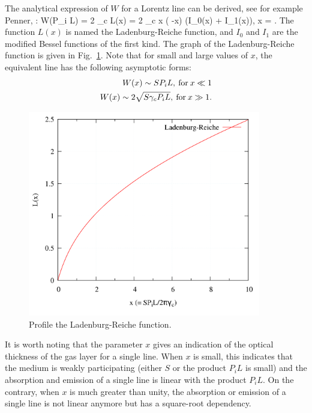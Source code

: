 The analytical expression of $W$ for a Lorentz line can be derived, see for example Penner, \cite{Penner1959}:
\be
W(P_i L) = 2 \pi \gamma_c L(x) = 2  \pi \gamma_c x \;\exp\left( -x\right) \left(I_0(x) + I_1(x)\right), \; x = .
\ee
The function $L(x)$ is named the Ladenburg-Reiche function, and $I_0$ and $I_1$ are the modified Bessel functions of the first kind. The graph of the Ladenburg-Reiche function is
given in Fig.~\ref{fig:Ladenburg}. Note that for small and large values of $x$, the equivalent line has the following asymptotic forms:
\begin{align}
W(x) \sim SP_iL ,\: {\rm for}\: x \ll 1 \\
W(x) \sim 2\sqrt{S\gamma_c P_iL} ,\: {\rm for}\: x \gg 1.
\end{align}

\begin{figure}
\begin{center}
 \includegraphics[width=4.0in]{Figures/Ladenburg.png}
\end{center}
 \caption{Profile the Ladenburg-Reiche function. \label{fig:Ladenburg}}
\end{figure}

It is worth noting that the parameter $x$ gives an indication of the optical thickness of the gas layer for a single line. When $x$ is small, this indicates that the medium is weakly participating (either $S$ or the product $P_iL$ is small) and the absorption and emission of a single line is linear with the product $P_iL$. On the contrary, when $x$ is much greater than unity, the absorption or emission of a single line is not linear anymore but has a square-root dependency.

